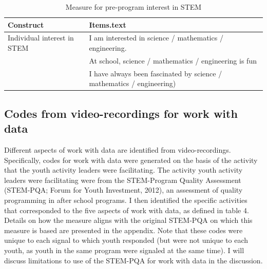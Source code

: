 \documentclass[]{book}
\theoremstyle{definition}
\theoremstyle{definition}
\theoremstyle{definition}
\theoremstyle{remark}
\begin{document}
\begin{table}

\caption{\label{tab:unnamed-chunk-5}Measure for pre-program interest in STEM}
\centering
\begin{tabular}[t]{ll}
\toprule
Construct & Items.text\\
\midrule
Individual interest in STEM & I am interested in science / mathematics / engineering.\\
 & At school, science / mathematics / engineering is fun\\
 & I have always been fascinated by science / mathematics / engineering)\\
\bottomrule
\end{tabular}
\end{table}

\subsection{Codes from video-recordings for work with
data}\label{codes-from-video-recordings-for-work-with-data}

Different aspects of work with data are identified from
video-recordings. Specifically, codes for work with data were generated
on the basis of the activity that the youth activity leaders were
facilitating. The activity youth activity leaders were facilitating were
from the STEM-Program Quality Assessment (STEM-PQA; Forum for Youth
Investment, 2012), an assessment of quality programming in after school
programs. I then identified the specific activities that corresponded to
the five aspects of work with data, as defined in table 4. Details on
how the measure aligns with the original STEM-PQA on which this measure
is based are presented in the appendix. Note that these codes were
unique to each signal to which youth responded (but were not unique to
each youth, as youth in the same program were signaled at the same
time). I will discuss limitations to use of the STEM-PQA for work with
data in the discussion.
\end{document}
